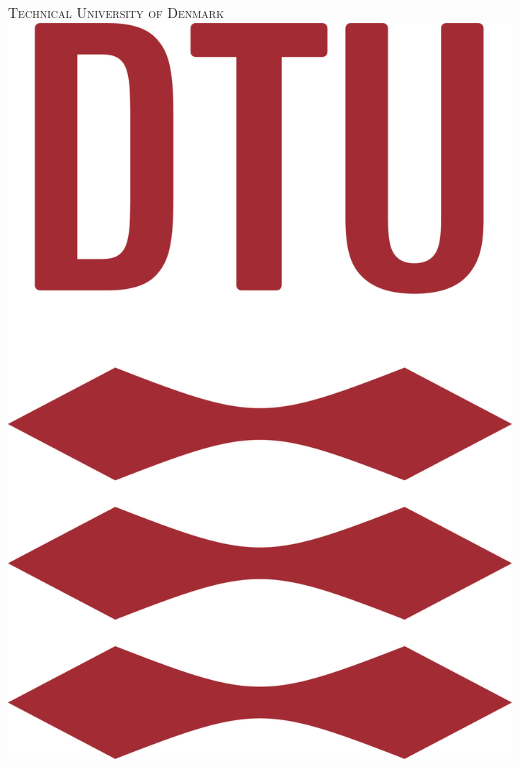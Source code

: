 \begin{titlepage} %
	\newcommand{\HRule}{\rule{\linewidth}{0.5mm}} %
	
	\center %
	   
	
	
	\textsc{\LARGE Technical University of Denmark}\\[1.5cm] %
	
    \includegraphics[scale=0.15]{Billeder/DTULogo.png}\\
	

\end{titlepage}
